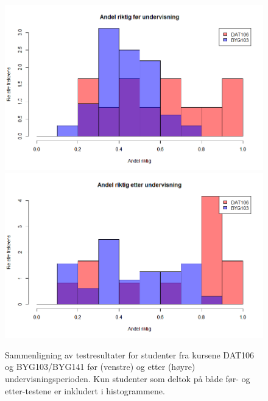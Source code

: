 \documentclass[a4paper,norsk,12pt]{report}
\begin{document}
\begin{figure}[p]
	\includegraphics[width=.48\textwidth]{./preScore}
	\includegraphics[width=.48\textwidth]{./postScore}
	\caption{Sammenligning av testresultater for studenter fra kursene DAT106 og  BYG103/BYG141 før (venstre) og etter (høyre) undervisningsperioden. Kun studenter som deltok på både før- og etter-testene er inkludert i histogrammene.}
	\label{fig:testScoreMatch}
\end{figure}
\end{document}
